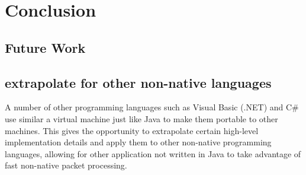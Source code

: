 \documentclass[final_report.tex]{subfiles}
\begin{document}
\section{Conclusion}

\subsection{Future Work}

\subsection{extrapolate for other non-native languages}
A number of other programming languages such as Visual Basic (.NET) and C\# use similar a virtual machine just like Java to make them portable to other machines. This gives the opportunity to extrapolate certain high-level implementation details and apply them to other non-native programming languages, allowing for other application not written in Java to take advantage of fast non-native packet processing. 
\end{document}
